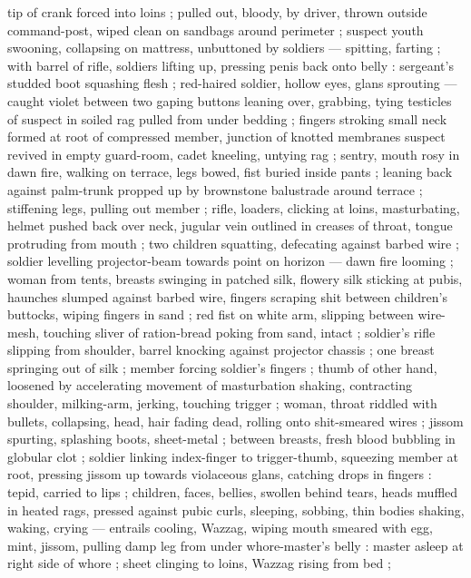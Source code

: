tip of crank forced into loins ; pulled out, bloody, by driver, thrown outside command-post, wiped
clean on sandbags around perimeter ; suspect youth swooning, collapsing on mattress, unbuttoned by
soldiers --- spitting, farting ; with barrel of rifle, soldiers lifting up, pressing penis back onto
belly : sergeant's studded boot squashing flesh ; red-haired soldier, hollow eyes, glans sprouting
--- caught violet between two gaping buttons {\dashcom} leaning over, grabbing, tying testicles of
suspect in soiled rag pulled from under bedding ; fingers stroking small neck formed at root of
compressed member, junction of knotted membranes {\semitwoslash} suspect revived in empty guard-room,
cadet kneeling, untying rag ; sentry, mouth rosy in dawn fire, walking on terrace, legs bowed, fist
buried inside pants ; leaning back against palm-trunk propped up by %
brownstone balustrade around terrace ; stiffening legs, pulling out member ; rifle, loaders,
clicking at loins, masturbating, helmet pushed back over neck, jugular vein outlined in creases of
throat, tongue protruding from mouth ; two children squatting, defecating against barbed wire ;
soldier levelling projector-beam towards point on horizon --- dawn fire looming ; woman from tents,
breasts swinging in patched silk, flowery silk sticking at pubis, haunches slumped against barbed
wire, fingers scraping shit between children's buttocks, wiping fingers in sand ; red fist on white
arm, slipping between wire-mesh, touching sliver of ration-bread poking from sand, intact ;
soldier's rifle slipping from shoulder, barrel knocking against projector chassis ; one breast
springing out of silk ; member forcing soldier's fingers ; thumb of other hand, loosened by
accelerating movement of masturbation shaking, contracting shoulder, milking-arm, jerking, touching
trigger ; woman, throat riddled with bullets, collapsing, head, hair fading dead, rolling onto
shit-smeared wires ; jissom spurting, splashing boots, sheet-metal ; between breasts, fresh blood
bubbling in globular clot ; soldier linking index-finger to trigger-thumb, squeezing member at root,
pressing jissom up towards violaceous glans, catching drops in fingers : tepid, carried to lips ;
children, faces, bellies, swollen behind tears, heads muffled in heated rags, pressed against pubic
curls, sleeping, sobbing, thin bodies shaking, waking, crying --- entrails cooling, {\twoslash}
Wazzag, wiping mouth smeared with egg, mint, jissom, pulling damp leg from under whore-master's
belly : master asleep at right side of whore ; sheet clinging to loins, Wazzag rising from bed ;
